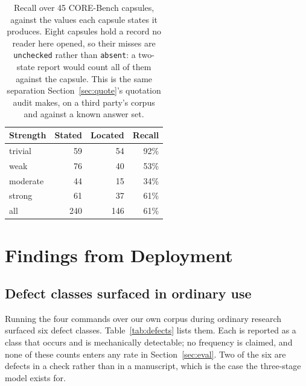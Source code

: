 \documentclass{article}
\newcommand{\code}[1]{\texttt{#1}}
\begin{document}
\begin{table}[h]
\centering
\small
\caption{Recall over 45 CORE-Bench capsules, against the values each capsule states it
produces. Eight capsules hold a record no reader here opened, so their misses are
\code{unchecked} rather than \code{absent}: a two-state report would count all of them against
the capsule. This is the same separation Section~\ref{sec:quote}'s quotation audit makes, on a
third party's corpus and against a known answer set.}
\label{tab:recall}
\begin{tabular}{@{}lrrr@{}}
\toprule
\textbf{Strength} & \textbf{Stated} & \textbf{Located} & \textbf{Recall} \\
\midrule
trivial & 59 & 54 & 92\% \\
weak & 76 & 40 & 53\% \\
moderate & 44 & 15 & 34\% \\
strong & 61 & 37 & 61\% \\
\midrule
all & 240 & 146 & 61\% \\
\bottomrule
\end{tabular}
\end{table}

\section{Findings from Deployment}
\label{sec:failures}

\subsection{Defect classes surfaced in ordinary use}

Running the four commands over our own corpus during ordinary research surfaced six defect classes.
Table~\ref{tab:defects} lists them. Each is reported as a class that occurs and is mechanically
detectable; no frequency is claimed, and none of these counts enters any rate in
Section~\ref{sec:eval}. Two of the six are defects in a check rather than in a manuscript, which
is the case the three-stage model exists for.
\end{document}
